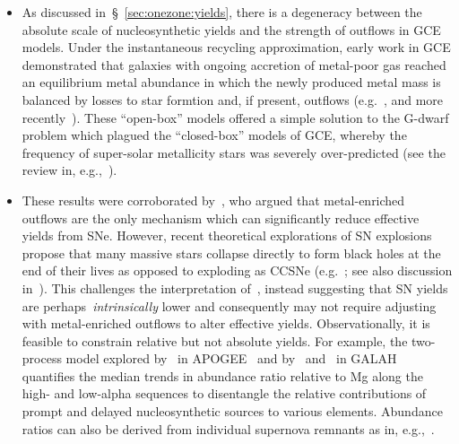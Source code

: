 \documentclass[ms.tex]{subfiles}
\begin{document}
\begin{itemize}

	\item As discussed in~\S~\ref{sec:onezone:yields}, there is a
	degeneracy between the absolute scale of nucleosynthetic yields and the
	strength of outflows in GCE models.
	Under the instantaneous recycling approximation, early work in GCE
	demonstrated that galaxies with ongoing accretion of metal-poor gas
	reached an equilibrium metal abundance in which the newly produced metal
	mass is balanced by losses to star formtion and, if present, outflows
	(e.g.~\citealp{Larson1972}, and more recently~\citealp{Weinberg2017}).
	These ``open-box'' models offered a simple solution to the G-dwarf problem
	which plagued the ``closed-box'' models of GCE, whereby the frequency of
	super-solar metallicity stars was severely over-predicted (see the review
	in, e.g.,~\citealp{Tinsley1980}).

	\item These results were corroborated by~\citet{Dalcanton2007}, who argued
	that metal-enriched outflows are the only mechanism which can
	significantly reduce effective yields from SNe.
	However, recent theoretical explorations of SN explosions propose that
	many massive stars collapse directly to form black holes at the end of
	their lives as opposed to exploding as CCSNe (e.g.~\citealp{Ertl2016,
	Sukhbold2016}; see also discussion in~\citealp{Griffith2021}).
	This challenges the interpretation of~\citet{Dalcanton2007}, instead
	suggesting that SN yields are perhaps~\textit{intrinsically} lower and
	consequently may not require adjusting with metal-enriched outflows to
	alter effective yields.
	Observationally, it is feasible to constrain relative but not absolute
	yields.
	For example, the two-process model explored by~\citet{Weinberg2019,
	Weinberg2021} in APOGEE~\citep{Majewski2017} and by~\citet*{Griffith2019}
	and~\citet{Griffith2022} in GALAH~\mbox{\citep{DeSilva2015, Martell2017}}
	quantifies the median trends in abundance ratio relative to Mg along the
	high- and low-alpha sequences to disentangle the relative contributions of
	prompt and delayed nucleosynthetic sources to various elements.
	Abundance ratios can also be derived from individual supernova remnants as
	in, e.g.,~\citet*{Holland-Ashford2020}.


\end{itemize}
\end{document}
